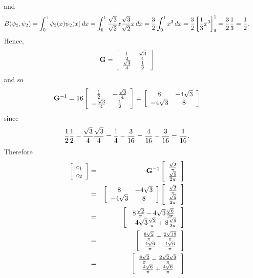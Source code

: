 \begin{solution}
\begin{enumerate}
\[\]
and
\[
B(\psi_2,\psi_2)=\int_0^1\psi_2(x)\psi_2(x)\,dx=\int_0^1{\sqrt{3}\over\sqrt{2}}x{\sqrt{3}\over\sqrt{2}}x\,dx={3\over 2}\int_0^1x^2\,dx={3\over 2}\left[{1\over 3}x^3\right]_0^1={3\over 2}{1\over 3}={1\over 2}.
\]
Hence,
\[
{\bf G}=\left[\begin{array}{cc} {1\over 2} & {\sqrt{3}\over 4} \\ {\sqrt{3}\over 4} & {1\over 2}\end{array}\right]
\]
and so
\[
{\bf G}^{-1}=16\left[\begin{array}{cc} {1\over 2} & -{\sqrt{3}\over 4} \\ -{\sqrt{3}\over 4} & {1\over 2}\end{array}\right]=\left[\begin{array}{cc} 8 & -4\sqrt{3} \\ -4\sqrt{3} & 8\end{array}\right]
\]
since
\[
{1\over2}{1\over2}-{\sqrt{3}\over 4}{\sqrt{3}\over 4}={1\over4}-{3\over 16}={4\over16}-{3\over 16}={1\over 16}.
\]
Therefore
\begin{eqnarray*}
\left[\begin{array}{c}c_1 \\ c_2\end{array}\right]&=&\BG^{-1}\left[\begin{array}{c}{\sqrt{2}\over\pi} \\ {\sqrt{6}\over 2\pi}\end{array}\right]
\\
&=&\left[\begin{array}{cc} 8 & -4\sqrt{3} \\ -4\sqrt{3} & 8\end{array}\right]\left[\begin{array}{c}{\sqrt{2}\over\pi} \\ {\sqrt{6}\over 2\pi}\end{array}\right]
\\
&=&\left[\begin{array}{c}8{\sqrt{2}\over\pi}-4\sqrt{3}{\sqrt{6}\over 2\pi}\\-4\sqrt{3}{\sqrt{2}\over\pi}+8{\sqrt{6}\over 2\pi}\end{array}\right]
\\
&=&\left[\begin{array}{c}{8\sqrt{2}\over\pi}-{2\sqrt{18}\over\pi}\\{4\sqrt{6}\over\pi}+{4\sqrt{6}\over \pi}\end{array}\right]
\\
&=&\left[\begin{array}{c}{8\sqrt{2}\over\pi}-{2\sqrt{2}\sqrt{9}\over\pi}\\{4\sqrt{6}\over\pi}+{4\sqrt{6}\over \pi}\end{array}\right]

\end{eqnarray*}
\end{enumerate}
\end{solution}
